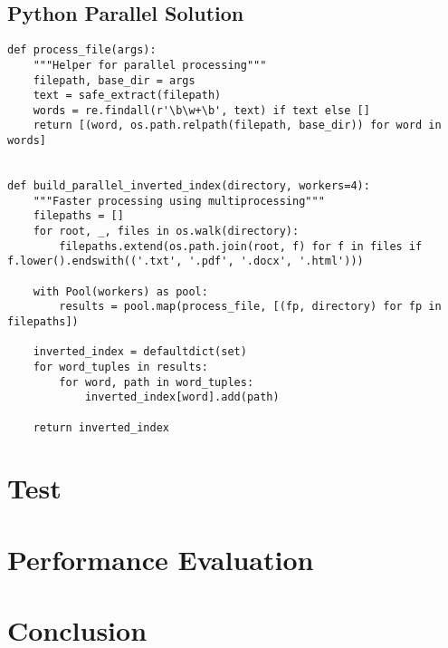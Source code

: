 \subsection{Python Parallel Solution}\label{subsec:python-parallel-solution}

\begin{lstlisting}[style=pythonstyle,label={lst:parallel-inverted-index-python},caption={Parallel Inverted Index Python}]
def process_file(args):
    """Helper for parallel processing"""
    filepath, base_dir = args
    text = safe_extract(filepath)
    words = re.findall(r'\b\w+\b', text) if text else []
    return [(word, os.path.relpath(filepath, base_dir)) for word in words]


def build_parallel_inverted_index(directory, workers=4):
    """Faster processing using multiprocessing"""
    filepaths = []
    for root, _, files in os.walk(directory):
        filepaths.extend(os.path.join(root, f) for f in files if f.lower().endswith(('.txt', '.pdf', '.docx', '.html')))

    with Pool(workers) as pool:
        results = pool.map(process_file, [(fp, directory) for fp in filepaths])

    inverted_index = defaultdict(set)
    for word_tuples in results:
        for word, path in word_tuples:
            inverted_index[word].add(path)

    return inverted_index
\end{lstlisting}

\section{Test}\label{sec:test}



\section{Performance Evaluation}\label{sec:performance-evaluation}



\section{Conclusion}\label{sec:conclusion}







